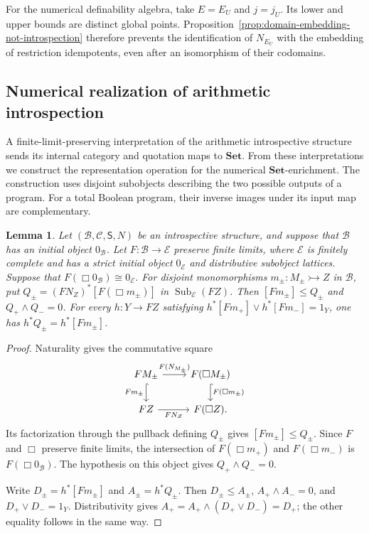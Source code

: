 \documentclass[11pt]{article}
\newtheorem{lemma}[theorem]{Lemma}
\theoremstyle{definition}
\theoremstyle{remark}
\begin{document}
For the numerical definability algebra, take $E=E_U$ and
$j=j_U$. Its lower and upper bounds are distinct global
points. Proposition~\ref{prop:domain-embedding-not-introspection}
therefore prevents the identification of $N_{E_U}$ with the
embedding of restriction idempotents, even after an isomorphism of their codomains.

\subsection{Numerical realization of arithmetic introspection}
\label{sec:quotation-realization}

A finite-limit-preserving interpretation of the arithmetic
introspective structure sends its internal category and quotation
maps to $\mathbf{Set}$. From these interpretations we construct
the representation operation for the numerical $\mathbf{Set}$-enrichment.
The construction uses disjoint subobjects describing
the two possible outputs of a program. For a total Boolean
program, their inverse images under its input map are complementary.

\begin{lemma}\label{lem:realized-disjoint-subobjects}
Let $(\mathcal B,\mathcal C,\mathsf S,N)$ be an introspective
structure, and suppose that $\mathcal B$ has an initial object
$0_{\mathcal B}$. Let $F:\mathcal B\to\mathcal E$ preserve finite
limits, where $\mathcal E$ is finitely complete and has a strict initial object
$0_{\mathcal E}$ and distributive subobject lattices. Suppose that
$F(\Box0_{\mathcal B})\cong0_{\mathcal E}$.
For disjoint monomorphisms $m_\pm:M_\pm\rightarrowtail Z$ in
$\mathcal B$, put
$Q_\pm=(FN_Z)^*[F(\Box m_\pm)]$ in
$\operatorname{Sub}_{\mathcal E}(FZ)$.
Then $[Fm_\pm]\leq Q_\pm$ and $Q_+\wedge Q_-=0$.
For every $h:Y\to FZ$ satisfying
$h^*[Fm_+]\vee h^*[Fm_-]=1_Y$, one has
$h^*Q_\pm=h^*[Fm_\pm]$.
\end{lemma}
\begin{proof}
Naturality gives the commutative square
\[
\begin{tikzcd}
 FM_\pm \arrow[r,"F(N_{M_\pm})"] \arrow[d,hook,"Fm_\pm"']
   & F(\Box M_\pm) \arrow[d,hook,"F(\Box m_\pm)"]\\
 FZ \arrow[r,"FN_Z"'] & F(\Box Z).
\end{tikzcd}
\]
Its factorization through the pullback defining $Q_\pm$ gives
$[Fm_\pm]\leq Q_\pm$. Since $F$ and $\Box$ preserve finite
limits, the intersection of $F(\Box m_+)$ and $F(\Box m_-)$ is
$F(\Box0_{\mathcal B})$. The hypothesis on this object gives
$Q_+\wedge Q_-=0$.

Write $D_\pm=h^*[Fm_\pm]$ and $A_\pm=h^*Q_\pm$.
Then $D_\pm\leq A_\pm$, $A_+\wedge A_-=0$, and
$D_+\vee D_-=1_Y$. Distributivity gives
$A_+=A_+\wedge(D_+\vee D_-)=D_+$; the other equality follows
in the same way.
\end{proof}
\end{document}

